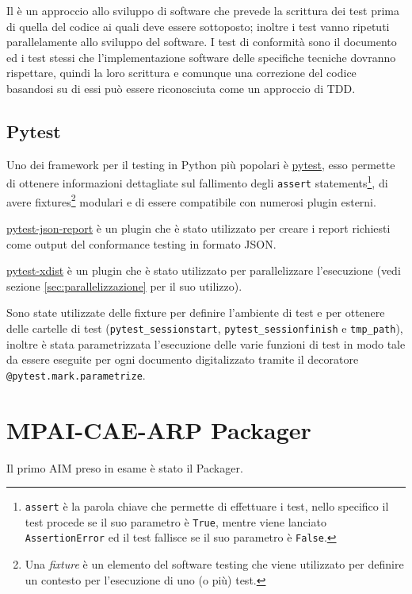 Il  è un approccio allo sviluppo di software che prevede la scrittura dei test prima di quella del codice ai quali deve essere sottoposto; inoltre i test vanno ripetuti parallelamente allo sviluppo del software.
I test di conformità sono il documento ed i test stessi che l'implementazione software delle specifiche tecniche dovranno rispettare, quindi la loro scrittura e comunque una correzione del codice basandosi su di essi può essere riconosciuta come un approccio di \ac{TDD}.


\subsection{Pytest} \label{ssec:pytest} %
Uno dei framework per il testing in Python più popolari è \href{https://pytest.org}{pytest}, esso permette di ottenere informazioni dettagliate sul fallimento degli \texttt{assert} statements\footnote{\texttt{assert} è la parola chiave che permette di effettuare i test, nello specifico il test procede se il suo parametro è \texttt{True}, mentre viene lanciato \texttt{AssertionError} ed il test fallisce se il suo parametro è \texttt{False}.}, di avere fixtures\footnote{Una \textit{fixture} è un elemento del software testing che viene utilizzato per definire un contesto per l'esecuzione di uno (o più) test.} modulari e di essere compatibile con numerosi plugin esterni.

\href{https://github.com/numirias/pytest-json-report}{pytest-json-report} è un plugin che è stato utilizzato per creare i report richiesti come output del conformance testing in formato JSON.

\href{https://pytest-xdist.readthedocs.io/}{pytest-xdist} è un plugin che è stato utilizzato per parallelizzare l'esecuzione (vedi sezione \ref{sec:parallelizzazione} per il suo utilizzo).

Sono state utilizzate delle fixture per definire l'ambiente di test e per ottenere delle cartelle di test (\verb|pytest_sessionstart|, \verb|pytest_sessionfinish| e \verb|tmp_path|), inoltre è stata parametrizzata l'esecuzione delle varie funzioni di test in modo tale da essere eseguite per ogni documento digitalizzato tramite il decoratore \texttt{@pytest.mark.parametrize}.


\section{MPAI-CAE-ARP Packager} \label{sec:test-packager}
Il primo \ac{AIM} preso in esame è stato il Packager.

